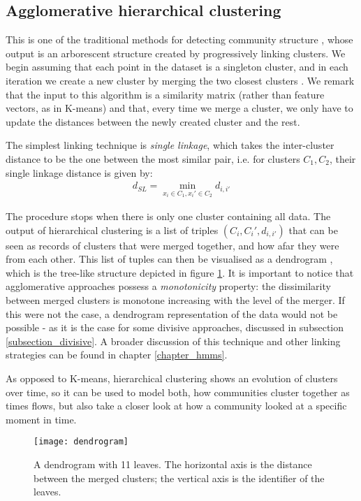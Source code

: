 \documentclass[../main.tex]{subfiles} \label{chapter_soa}
\begin{document}
\subsection{Agglomerative hierarchical clustering} \label{subsection_hier}
This is one of the traditional methods for detecting community structure \cite{Girvan2002}, whose output is an arborescent structure created by progressively linking clusters. We begin assuming that each point in the dataset is a singleton cluster, and in each iteration we create a new cluster by merging the two closest clusters \cite{hastie2008}. We remark that the input to this algorithm is a similarity matrix (rather than feature vectors, as in K-means) and that, every time we merge a cluster, we only have to update the distances between the newly created cluster and the rest. 
\par The simplest linking technique is \emph{single linkage}, which takes the inter-cluster distance to be the one between the most similar pair, i.e. for clusters $C_1, C_2$, their single linkage distance is given by:
\begin{align*}
d_{SL} = \min_{x_i\in C_1, x_i'\in C_2}{d_{i,i'}}
\end{align*}
\par The procedure stops when there is only one cluster containing all data. The output of hierarchical clustering is a list of triples $(C_i, C_i', d_{i,i'})$ that can be seen as records of clusters that were merged together, and how afar they were from each other. This list of tuples can then be visualised as a dendrogram \cite{HAGMathworks}, which is the tree-like structure depicted in figure \ref{fig_hag}. It is important to notice that agglomerative approaches possess a \emph{monotonicity} property: the dissimilarity between merged clusters is monotone increasing with the level of the merger. If this were not the case, a dendrogram representation of the data would not be possible \cite{hastie2008} - as it is the case for some divisive approaches, discussed in subsection \ref{subsection_divisive}. A broader discussion of this technique and other linking strategies can be found in chapter \ref{chapter_hmms}.
\par As opposed to K-means, hierarchical clustering shows an evolution of clusters over time, so it can be used to model both, how communities cluster together as times flows, but also take a closer look at how a community looked at a specific moment in time.
\begin{figure}[t]
\centering
\texttt{[image: dendrogram]}
\caption{A dendrogram with 11 leaves. The horizontal axis is the distance between the merged clusters; the vertical axis is the identifier of the leaves.}
\label{fig_hag}
\end{figure}
\end{document}
